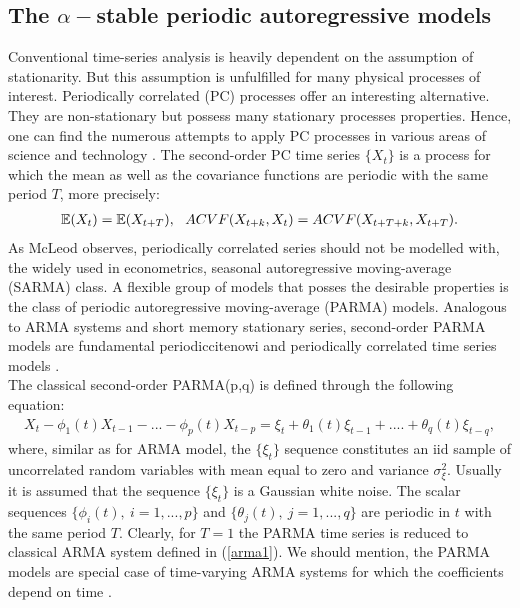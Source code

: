 \subsection{The $\alpha-$stable periodic autoregressive models}
Conventional time-series analysis is heavily dependent on the assumption of stationarity. But this assumption is unfulfilled for many physical processes of interest. Periodically correlated (PC) processes offer an interesting alternative. They are non-stationary but possess many stationary processes properties. Hence, one can find the numerous attempts to apply PC processes in various areas of science and technology \cite{broszkiewicz2004detecting}. The second-order PC time series $\{X_t\}$ is a process for which the mean as well as the covariance functions are periodic with the same period $T$, more precisely:
\begin{eqnarray*}
\label{eq:periodicity}
\operatorname{\mathbb{E}}(X_{t})=\operatorname{\mathbb{E}}(X_{t+T}),~~ACVF(X_{t+k},X_t)=ACVF(X_{t+T+k},X_{t+T}).
\end{eqnarray*}
As McLeod \cite{mcleod1993parsimony} observes, periodically correlated series should not be modelled with,
the widely used in econometrics, seasonal autoregressive moving-average (SARMA) class.  A flexible group of models that posses the desirable properties is the class
of periodic autoregressive moving-average (PARMA) models. Analogous to ARMA systems and short memory stationary series, second-order PARMA models are fundamental periodiccite{nowi}
and periodically correlated time series models \cite{vecchia1985periodic,ghysels2001econometric,lund2000recursive}.\\
The classical second-order PARMA(p,q) is defined through the following equation:
\begin{eqnarray}\label{parma1}
X_t-\phi_1(t)X_{t-1}-...-\phi_p(t)X_{t-p}=\xi_{t}+\theta_1(t)\xi_{t-1}+....+\theta_q(t)\xi_{t-q},
\end{eqnarray}
where, similar as for ARMA model, the $\{\xi_t\}$ sequence constitutes an iid sample of uncorrelated random variables with mean equal to zero and variance $\sigma_{\xi}^2$. Usually it is assumed that the sequence $\{\xi_t\}$ is a Gaussian white noise. The scalar sequences $\{\phi_i(t),~i=1,...,p\}$ and $\{\theta_j(t),~j=1,...,q\}$ are periodic in $t$ with the same period $T$. Clearly, for $T= 1$ the PARMA time series  is reduced to classical ARMA system defined in (\ref{arma1}). We should mention, the PARMA models are special case of time-varying ARMA systems for which the coefficients depend on time \cite{nw1}.\\
